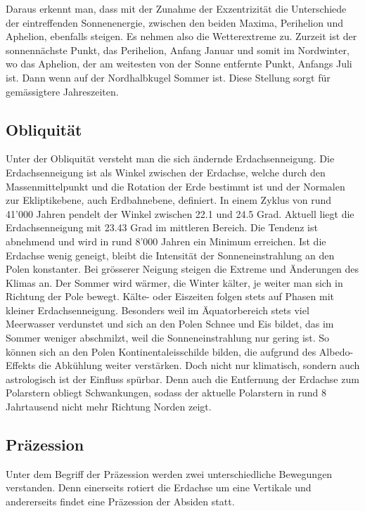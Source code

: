 Daraus erkennt man, dass mit der Zunahme der Exzentrizität die Unterschiede der eintreffenden Sonnenenergie, zwischen den beiden Maxima, Perihelion und Aphelion, ebenfalls steigen.
Es nehmen also die Wetterextreme zu.
Zurzeit ist der sonnennächste Punkt, das Perihelion, Anfang Januar und somit im Nordwinter, wo das Aphelion, der am weitesten von der Sonne entfernte Punkt, Anfangs Juli ist.
Dann wenn auf der Nordhalbkugel Sommer ist.
Diese Stellung sorgt für gemässigtere Jahreszeiten. 

\subsection{Obliquität
\label{milankovic:subsection:Obliquität}}
Unter der Obliquität versteht man die sich ändernde Erdachsenneigung.
Die Erdachsenneigung ist als Winkel zwischen der Erdachse, welche durch den Massenmittelpunkt und die Rotation der Erde bestimmt ist und der Normalen zur Ekliptikebene, auch Erdbahnebene, definiert.
In einem Zyklus von rund 41'000 Jahren pendelt der Winkel zwischen 22.1 und 24.5 Grad.
Aktuell liegt die Erdachsenneigung mit 23.43 Grad im mittleren Bereich.
Die Tendenz ist abnehmend und wird in rund 8’000 Jahren ein Minimum erreichen.
Ist die Erdachse wenig geneigt, bleibt die Intensität der Sonneneinstrahlung an den Polen konstanter.
Bei grösserer Neigung steigen die Extreme und Änderungen des Klimas an.
Der Sommer wird wärmer, die Winter kälter, je weiter man sich in Richtung der Pole bewegt.
Kälte- oder Eiszeiten folgen stets auf Phasen mit kleiner Erdachsenneigung.
Besonders weil im Äquatorbereich stets viel Meerwasser verdunstet und sich an den Polen Schnee und Eis bildet, das im Sommer weniger abschmilzt, weil die Sonneneinstrahlung nur gering ist.
So können sich an den Polen Kontinentaleisschilde bilden, die aufgrund des Albedo-Effekts die Abkühlung weiter verstärken.
Doch nicht nur klimatisch, sondern auch astrologisch ist der Einfluss spürbar.
Denn auch die Entfernung der Erdachse zum Polarstern obliegt Schwankungen, sodass der aktuelle Polarstern in rund 8 Jahrtausend nicht mehr Richtung Norden zeigt.

\subsection{Präzession
\label{milankovic:subsection:Präzession}}
Unter dem Begriff der Präzession werden zwei unterschiedliche Bewegungen verstanden.
Denn einerseits rotiert die Erdachse um eine Vertikale und andererseits findet eine Präzession der Absiden statt. 

